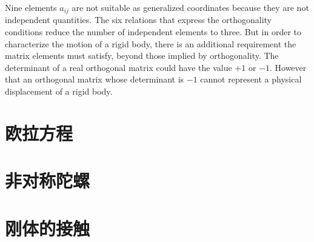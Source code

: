 \documentclass[12pt,a4paper]{article}
\begin{document}
\cite{goldstein2011classical} Nine elements $a_{ij}$ are not suitable as generalized coordinates because they are not independent quantities. The six relations that express the orthogonality conditions reduce the number of independent elements to three. But in order to characterize the motion of a rigid body, there is an additional requirement the matrix elements must satisfy, beyond those implied by orthogonality. The determinant of a real orthogonal matrix could have the value $+1$ or $-1$. However that an orthogonal matrix whose determinant is $-1$ cannot represent a physical displacement of a rigid body.

















\section{欧拉方程}












































\section{非对称陀螺}













\section{刚体的接触}





















\end{document}
